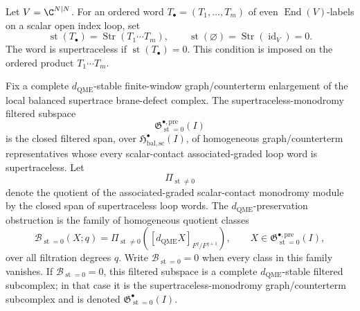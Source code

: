 \begin{defn}
\label{def:app-supertraceless-monodromy-precomplex}
  Let \(V=\C^{N|N}\).  For an ordered word
  \(T_\bullet=(T_1,\ldots,T_m)\) of even \(\operatorname{End}(V)\)-labels
  on a scalar open index loop, set
  \[
    \operatorname{st}(T_\bullet)
      =
    \operatorname{Str}(T_1\cdots T_m),
    \qquad
    \operatorname{st}(\varnothing)
      =
    \operatorname{Str}(\operatorname{id}_V)=0 .
  \]
  The word is supertraceless if \(\operatorname{st}(T_\bullet)=0\).
  This condition is imposed on the ordered product \(T_1\cdots T_m\).

  Fix a complete \(d_{\mathrm{QME}}\)-stable finite-window
  graph/counterterm enlargement of the local balanced supertrace
  brane-defect complex.  The supertraceless-monodromy
  filtered subspace
  \[
    \mathfrak G^{\bullet,\mathrm{pre}}_{\operatorname{st}=0}(I)
  \]
  is the closed filtered span, over
  \(\mathfrak H^\bullet_{\mathrm{bal,sc}}(I)\), of homogeneous
  graph/counterterm representatives whose every scalar-contact
  associated-graded loop word is supertraceless.  Let
  \[
    \Pi_{\operatorname{st}\neq0}
  \]
  denote the quotient of the associated-graded scalar-contact monodromy
  module by the closed span of supertraceless loop words.  The
  \(d_{\mathrm{QME}}\)-preservation obstruction is the family of
  homogeneous quotient classes
  \[
    \mathcal B_{\operatorname{st}=0}(X;q)
      =
    \Pi_{\operatorname{st}\neq0}
    \left([d_{\mathrm{QME}}X]_{F^q/F^{q+1}}\right),
    \qquad
    X\in\mathfrak G^{\bullet,\mathrm{pre}}_{\operatorname{st}=0}(I),
  \]
  over all filtration degrees \(q\).  Write
  \(\mathcal B_{\operatorname{st}=0}=0\) when every class in this family
  vanishes.
  If \(\mathcal B_{\operatorname{st}=0}=0\), this filtered subspace is a complete
  \(d_{\mathrm{QME}}\)-stable filtered subcomplex; in that case it is
  the supertraceless-monodromy graph/counterterm subcomplex and
  is denoted
  \(\mathfrak G^\bullet_{\operatorname{st}=0}(I)\).
\end{defn}

